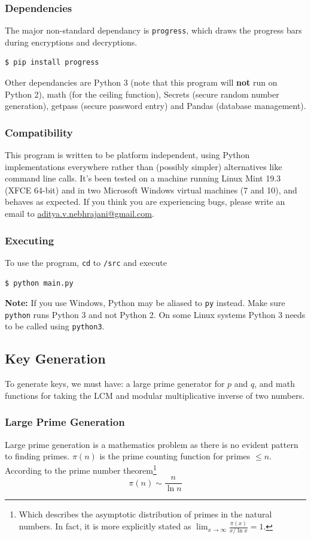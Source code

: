 \documentclass{article}
\begin{document}
\subsubsection{Dependencies}
The major non-standard dependancy is \texttt{progress}, which draws the progress bars during
encryptions and decryptions.
\begin{verbatim}
$ pip install progress
\end{verbatim}

Other dependancies are Python 3 (note that this program will \textbf{not} run on Python 2), math
(for the ceiling function), Secrets (secure random number generation), getpass (secure password
entry) and Pandas (database management).

\subsubsection{Compatibility}
This program is written to be platform independent, using Python implementations everywhere rather
than (possibly simpler) alternatives like command line calls. It's been tested on a machine running
Linux Mint 19.3 (XFCE 64-bit) and in two Microsoft Windows virtual machines (7 and 10), and behaves
as expected. If you think you are experiencing bugs, please write an email to \href{mailto:
aditya.v.nebhrajani@gmail.com}{aditya.v.nebhrajani@gmail.com}.


\subsubsection{Executing}
To use the program, \texttt{cd} to \texttt{/src} and execute
\begin{verbatim}
$ python main.py
\end{verbatim}


\textbf{Note:} If you use Windows, Python may be aliased to \texttt{py} instead. Make sure \texttt{python} runs Python 3 and not Python 2. On some Linux systems
Python 3 needs to be called using \texttt{python3}.


\subsection{Key Generation}
To generate keys, we must have: a large prime generator for $p$ and $q$, and math functions for
taking the LCM and modular multiplicative inverse of two numbers.

\subsubsection{Large Prime Generation}
Large prime generation is a mathematics problem as there is no evident pattern to finding primes.
$\pi(n)$ is the prime counting function for primes $\leq n$. According to the prime number
theorem\footnote{Which describes the asymptotic distribution of primes in the natural numbers. In fact, it is more explicitly stated as $\lim_{x\to\infty} \frac{\pi(x)}{x/ \ln{x}} = 1$.}
$$\pi(n) \sim \frac{n}{\ln{n}}$$
\end{document}
